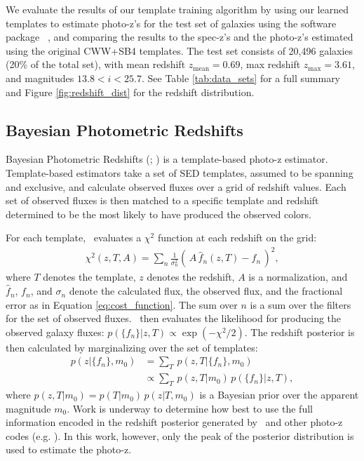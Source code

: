 
\label{sect:photoz}

We evaluate the results of our template training algorithm by using our learned templates to estimate photo-z's for the test set of galaxies using the software package \bpz\ \citep{Benitez2000a}, and comparing the results to the spec-z's and the photo-z's estimated using the original CWW+SB4 templates.
The test set consists of 20,496 galaxies (20\% of the total set), with mean redshift $z_\text{mean} = 0.69$, max redshift $z_\text{max} = 3.61$, and magnitudes $13.8 < i < 25.7$.
See Table \ref{tab:data_sets} for a full summary and Figure \ref{fig:redshift_dist} for the redshift distribution.

\subsection{Bayesian Photometric Redshifts}
\label{sect:bpz}

Bayesian Photometric Redshifts (\bpz; \citealt{Benitez2000a}) is a template-based photo-z estimator.
Template-based estimators take a set of SED templates, assumed to be spanning and exclusive, and calculate observed fluxes over a grid of redshift values. 
Each set of observed fluxes is then matched to a specific template and redshift determined to be the most likely to have produced the observed colors. 

For each template, \bpz\ evaluates a $\chi^2$ function at each redshift on the grid:
\begin{align}
    \chi^2 (z,T,A) = \sum_n \frac{1}{\sigma_n^2} (\, A \, \hat{f}_n(z,T) - f_n \,)^2,
    \label{eq:chi2}
\end{align}
where $T$ denotes the template, $z$ denotes the redshift, $A$ is a normalization, and $\hat{f}_n$, $f_n$, and $\sigma_n$ denote the calculated flux, the observed flux, and the fractional error as in Equation \ref{eq:cost_function}. 
The sum over $n$ is a sum over the filters for the set of observed fluxes. 
\bpz\ then evaluates the likelihood for producing the observed galaxy fluxes: $p(\{f_n\}|z,T) \propto \exp{(-\chi^2/2)}$. 
The redshift posterior is then calculated by marginalizing over the set of templates:
\begin{align}
    p(z|\{f_n\},m_0) &= \sum_T \, p(z,T|\{f_n\},m_0) \nonumber \\
                     &\propto \sum_T \, p(z,T|m_0) \, p(\{f_n\}|z,T),
\end{align}
where $p(z,T|m_0) = p(T|m_0) \, p(z|T,m_0)$ is a Bayesian prior over the apparent magnitude $m_0$. 
Work is underway to determine how best to use the full information encoded in the redshift posterior generated by \bpz\ and other photo-z codes (e.g. \citealt{Schmidt2020}). 
In this work, however, only the peak of the posterior distribution is used to estimate the photo-z.


